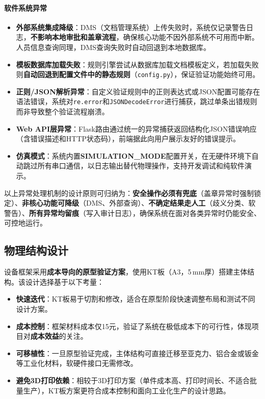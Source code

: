 \documentclass[conference]{IEEEtran}
\begin{document}
\paragraph{软件系统异常}

\begin{itemize}[leftmargin=*]
    \item \textbf{外部系统集成降级}：DMS（文档管理系统）上传失败时，系统仅记录警告日志，\textbf{不影响本地审批和盖章流程}，确保核心功能不因外部系统不可用而中断。人员信息查询同理，DMS查询失败时自动回退到本地数据库。
    \item \textbf{模板数据库加载失败}：规则引擎尝试从数据库加载文档模板定义，若加载失败则\textbf{自动回退到配置文件中的静态规则}（\texttt{config.py}），保证验证功能始终可用。
    \item \textbf{正则/JSON解析异常}：自定义验证规则中的正则表达式或JSON配置可能存在语法错误，系统对\texttt{re.error}和\texttt{JSONDecodeError}进行捕获，跳过单条出错规则而非导致整个验证流程崩溃。
    \item \textbf{Web API层异常}：Flask路由通过统一的异常捕获返回结构化JSON错误响应（含错误描述和HTTP状态码），前端据此向用户展示友好的错误提示。
    \item \textbf{仿真模式}：系统内置\textbf{SIMULATION\_MODE}配置开关，在无硬件环境下自动跳过所有串口通信，以日志输出替代物理操作，支持开发调试和纯软件演示。
\end{itemize}

\noindent 以上异常处理机制的设计原则可归纳为：\textbf{安全操作必须有兜底}（盖章异常时强制锁定）、\textbf{非核心功能可降级}（DMS、外部查询）、\textbf{不确定结果走人工}（歧义分类、软警告）、\textbf{所有异常均留痕}（写入审计日志），确保系统在面对各类异常时仍能安全、可控地运行。

\subsection{物理结构设计}

设备框架采用\textbf{成本导向的原型验证方案}，使用KT板（A3，5\,mm厚）搭建主体结构。该设计选择基于以下考量：

\begin{itemize}[leftmargin=*]
    \item \textbf{快速迭代}：KT板易于切割和修改，适合在原型阶段快速调整布局和测试不同设计方案。
    \item \textbf{成本控制}：框架材料成本仅15元，验证了系统在极低成本下的可行性，体现项目对\textbf{成本效益}的关注。
    \item \textbf{可移植性}：一旦原型验证完成，主体结构可直接迁移至亚克力、铝合金或钣金等工业化材料，软硬件接口无需修改。
    \item \textbf{避免3D打印依赖}：相较于3D打印方案（单件成本高、打印时间长、不适合批量生产），KT板方案更符合成本控制和面向工业化生产的设计思路。
\end{itemize}
\end{document}
